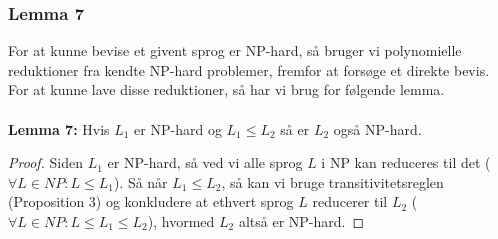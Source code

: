 \subsubsection{Lemma 7}

For at kunne bevise et givent sprog er NP-hard, så bruger vi polynomielle
reduktioner fra kendte NP-hard problemer, fremfor at forsøge et direkte bevis.
For at kunne lave disse reduktioner, så har vi brug for følgende lemma.\\
~\\
\textbf{Lemma 7:} Hvis $L_1$ er NP-hard og $L_1 \leq L_2$ så er $L_2$ også
NP-hard.

\begin{proof}
 Siden $L_1$ er NP-hard, så ved vi alle sprog $L$ i NP kan reduceres til
det ($\forall L \in NP: L \leq L_1$). Så når $L_1 \leq L_2$, så kan vi
bruge transitivitetsreglen (Proposition 3) og konkludere at ethvert sprog $L$
reducerer til $L_2$ ($\forall L \in NP: L \leq L_1 \leq L_2$), hvormed $L_2$
altså er NP-hard.
\end{proof}

